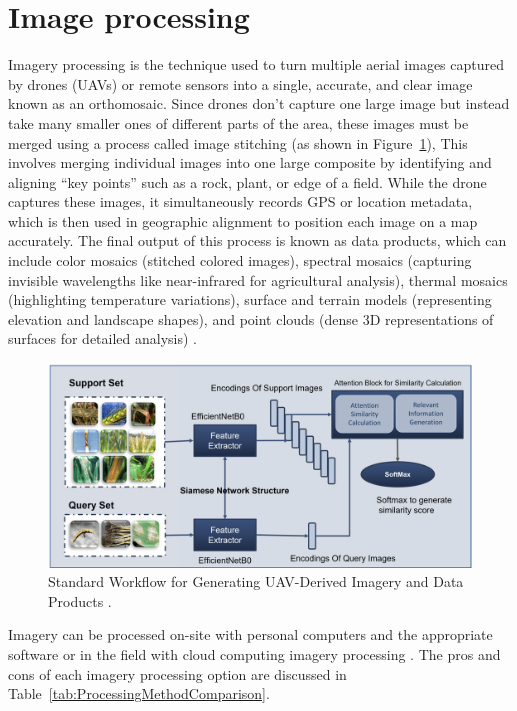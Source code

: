 \section{Image processing}

Imagery processing is the technique used to turn multiple aerial images captured by drones (UAVs) or remote sensors into a single, accurate, and clear image known as an orthomosaic. Since drones don’t capture one large image but instead take many smaller ones of different parts of the area, these images must be merged using a process called image stitching  (as shown in Figure~\ref{fig:UAVDataProducts}), This involves merging individual images into one large composite by identifying and aligning “key points” such as a rock, plant, or edge of a field. While the drone captures these images, it simultaneously records GPS or location metadata, which is then used in geographic alignment to position each image on a map accurately. The final output of this process is known as data products, which can include color mosaics (stitched colored images), spectral mosaics (capturing invisible wavelengths like near-infrared for agricultural analysis), thermal mosaics (highlighting temperature variations), surface and terrain models (representing elevation and landscape shapes), and point clouds (dense 3D representations of surfaces for detailed analysis) \parencite{olson2021review}.

\begin{figure}[H]
    \centering
    \includegraphics[width=0.8
    \textwidth]{chapters/chapter3/images/Figure06.png}
    \caption{Standard Workflow for Generating UAV-Derived Imagery and Data Products \protect\parencite{olson2021review}.}
    \label{fig:UAVDataProducts}
\end{figure}

Imagery can be processed on-site with personal computers and the appropriate software or in the field with cloud computing imagery processing \parencite{olson2021review}. The pros and cons of each imagery processing option are discussed in Table~\ref{tab:ProcessingMethodComparison}.

